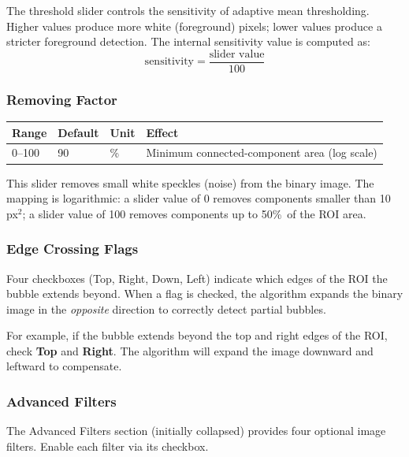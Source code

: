 \documentclass[11pt, letterpaper]{article}
\begin{document}
The threshold slider controls the sensitivity of adaptive mean thresholding.
Higher values produce more white (foreground) pixels; lower values produce
a stricter foreground detection. The internal sensitivity value is computed as:
\[
    \text{sensitivity} = \frac{\text{slider value}}{100}
\]

\subsubsection{Removing Factor}

\begin{center}
\begin{tabular}{llll}
    \toprule
    \textbf{Range} & \textbf{Default} & \textbf{Unit} & \textbf{Effect} \\
    \midrule
    0--100 & 90 & \% & Minimum connected-component area (log scale) \\
    \bottomrule
\end{tabular}
\end{center}

This slider removes small white speckles (noise) from the binary image.
The mapping is logarithmic: a slider value of 0 removes components smaller
than 10\,px$^2$; a slider value of 100 removes components up to 50\%\ of
the ROI area.

\subsubsection{Edge Crossing Flags}

Four checkboxes (Top, Right, Down, Left) indicate which edges of the ROI the
bubble extends beyond. When a flag is checked, the algorithm expands the
binary image in the \emph{opposite} direction to correctly detect partial
bubbles.

\begin{notebox}[Note]
    For example, if the bubble extends beyond the top and right edges of the
    ROI, check \textbf{Top} and \textbf{Right}. The algorithm will expand
    the image downward and leftward to compensate.
\end{notebox}

\subsubsection{Advanced Filters}

The Advanced Filters section (initially collapsed) provides four optional
image filters. Enable each filter via its checkbox.
\end{document}

